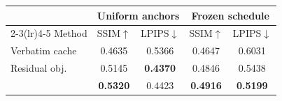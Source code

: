 \begin{tabular}{@{}lcccc@{}}
\toprule
 & \multicolumn{2}{c}{Uniform anchors} & \multicolumn{2}{c}{Frozen schedule} \\
\cmidrule(lr){2-3}\cmidrule(lr){4-5}
Method & SSIM$\uparrow$ & LPIPS$\downarrow$ & SSIM$\uparrow$ & LPIPS$\downarrow$ \\
\midrule
Verbatim cache & 0.4635 & 0.5366 & 0.4647 & 0.6031 \\
Residual obj. & 0.5145 & \textbf{0.4370} & 0.4846 & 0.5438 \\
\ourmethod{} & \textbf{0.5320} & 0.4423 & \textbf{0.4916} & \textbf{0.5199} \\
\bottomrule
\end{tabular}
